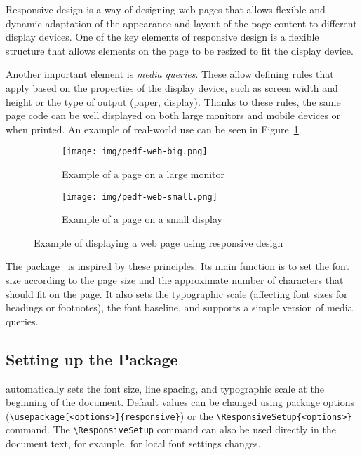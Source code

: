 \documentclass{ltugboat}
\begin{document}
Responsive design is a way of designing web pages that allows flexible and
dynamic adaptation of the appearance and layout of the page content to
different display devices. One of the key elements of responsive design is a
flexible structure that allows elements on the page to be resized to fit the
display device.

Another important element is \textit{media queries}. These allow defining rules
that apply based on the properties of the display device, such as screen width
and height or the type of output (paper, display). Thanks to these rules, the
same page code can be well displayed on both large monitors and mobile devices
or when printed. An example of real-world use can be seen in
Figure~\ref{fig:responsive}.

\begin{figure}[tbp]
\begin{subfigure}[t]{0.74\textwidth}
    \texttt{[image: img/pedf-web-big.png]}
    \caption{Example of a page on a large monitor}
\end{subfigure}
\hfill
\begin{subfigure}[t]{0.24\textwidth}
    \texttt{[image: img/pedf-web-small.png]}
    \caption{Example of a page on a small display}
\end{subfigure}
  \caption{Example of displaying a web page using responsive design}\label{fig:responsive}
\end{figure}

The  package~\cite{responsive} is inspired by these
principles. Its main function is to set the font size according to the page
size and the approximate number of characters that should fit on the page. It
also sets the typographic scale (affecting font sizes for headings or
footnotes), the font baseline, and supports a simple version of media queries.

\subsection{Setting up the  Package}

 automatically sets the font size, line spacing, and
typographic scale at the beginning of the document. Default values can be
changed using package options (\verb|\usepackage[<options>]{responsive}|) or
the \verb|\ResponsiveSetup{<options>}| command. The \verb|\ResponsiveSetup|
command can also be used directly in the document text, for example, for local
font settings changes.
\end{document}

